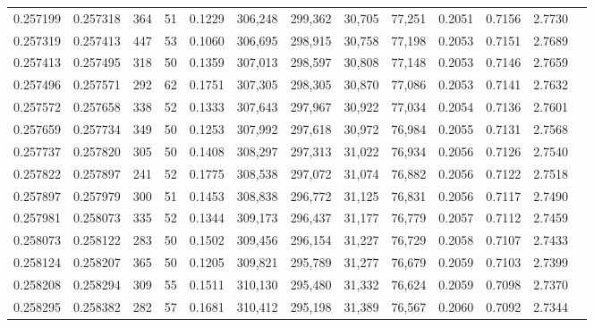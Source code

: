 \begin{tabular}{rrrrrrrrrrrrr}
0.257199 & 0.257318 &   364 &  51 &                                     0.1229 & 306,248 & 299,362 &  30,705 &  77,251 & 0.2051 & 0.7156 & 2.7730 \\
0.257319 & 0.257413 &   447 &  53 &                                     0.1060 & 306,695 & 298,915 &  30,758 &  77,198 & 0.2053 & 0.7151 & 2.7689 \\
0.257413 & 0.257495 &   318 &  50 &                                     0.1359 & 307,013 & 298,597 &  30,808 &  77,148 & 0.2053 & 0.7146 & 2.7659 \\
0.257496 & 0.257571 &   292 &  62 &                                     0.1751 & 307,305 & 298,305 &  30,870 &  77,086 & 0.2053 & 0.7141 & 2.7632 \\
0.257572 & 0.257658 &   338 &  52 &                                     0.1333 & 307,643 & 297,967 &  30,922 &  77,034 & 0.2054 & 0.7136 & 2.7601 \\
0.257659 & 0.257734 &   349 &  50 &                                     0.1253 & 307,992 & 297,618 &  30,972 &  76,984 & 0.2055 & 0.7131 & 2.7568 \\
0.257737 & 0.257820 &   305 &  50 &                                     0.1408 & 308,297 & 297,313 &  31,022 &  76,934 & 0.2056 & 0.7126 & 2.7540 \\
0.257822 & 0.257897 &   241 &  52 &                                     0.1775 & 308,538 & 297,072 &  31,074 &  76,882 & 0.2056 & 0.7122 & 2.7518 \\
0.257897 & 0.257979 &   300 &  51 &                                     0.1453 & 308,838 & 296,772 &  31,125 &  76,831 & 0.2056 & 0.7117 & 2.7490 \\
0.257981 & 0.258073 &   335 &  52 &                                     0.1344 & 309,173 & 296,437 &  31,177 &  76,779 & 0.2057 & 0.7112 & 2.7459 \\
0.258073 & 0.258122 &   283 &  50 &                                     0.1502 & 309,456 & 296,154 &  31,227 &  76,729 & 0.2058 & 0.7107 & 2.7433 \\
0.258124 & 0.258207 &   365 &  50 &                                     0.1205 & 309,821 & 295,789 &  31,277 &  76,679 & 0.2059 & 0.7103 & 2.7399 \\
0.258208 & 0.258294 &   309 &  55 &                                     0.1511 & 310,130 & 295,480 &  31,332 &  76,624 & 0.2059 & 0.7098 & 2.7370 \\
0.258295 & 0.258382 &   282 &  57 &                                     0.1681 & 310,412 & 295,198 &  31,389 &  76,567 & 0.2060 & 0.7092 & 2.7344 \\

\end{tabular}

